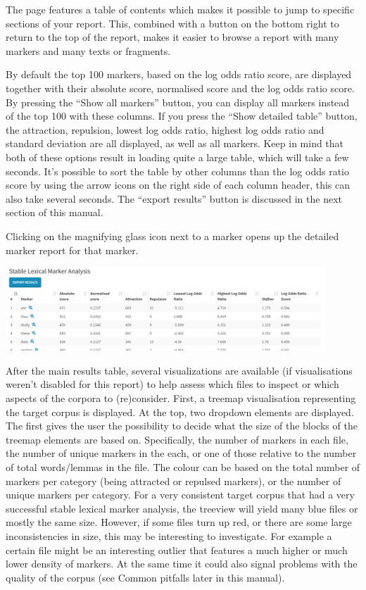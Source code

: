 \documentclass[11pt,a4paper]{article}
\begin{document}
The page features a table of contents which makes it possible to jump to specific sections of your report. This, combined with a button on the bottom right to return to the top of the report, makes it easier to browse a report with many markers and many texts or fragments. 

By default the top 100 markers, based on the log odds ratio score, are displayed together with their absolute score, normalised score and the log odds ratio score. By pressing the ``Show all markers'' button, you can display all markers instead of the top 100 with these columns. If you press the ``Show detailed table'' button, the attraction, repulsion, lowest log odds ratio, highest log odds ratio and standard deviation are all displayed, as well as all markers. Keep in mind that both of these options result in loading quite a large table, which will take a few seconds. It's possible to sort the table by other columns than the log odds ratio score by using the arrow icons on the right side of each column header, this can also take several seconds. The ``export results'' button is discussed in the next section of this manual.

Clicking on the magnifying glass icon next to a marker opens up the detailed marker report for that marker.

\centerline{\includegraphics[width=0.9\textwidth]{images/mainreport_detailtable.png}}

After the main results table, several visualizations are available (if visualisations weren't disabled for this report) to help assess which files to inspect or which aspects of the corpora to (re)consider. First, a treemap visualisation representing the target corpus is displayed. At the top, two dropdown elements are displayed. The first gives the user the possibility to decide what the size of the blocks of the treemap elements are based on. Specifically, the number of markers in each file, the number of unique markers in the each, or one of those relative to the number of total words/lemmas in the file. The colour can be based on the total number of markers per category (being attracted or repulsed markers), or the number of unique markers per category. For a very consistent target corpus that had a very successful stable lexical marker analysis, the treeview will yield many blue files or mostly the same size. However, if some files turn up red, or there are some large inconsistencies in size, this may be interesting to investigate. For example a certain file might be an interesting outlier that features a much higher or much lower density of markers. At the same time it could also signal problems with the quality of the corpus (see Common pitfalls later in this manual).
\end{document}
